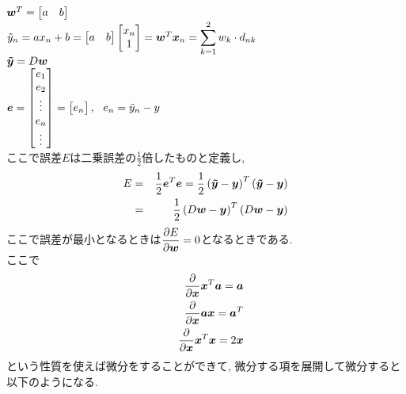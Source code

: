 $\mbox{\boldmath $w$}^{T} = \begin{bmatrix} a&b \end{bmatrix}$\\
$\tilde{y}_{n} = ax_{n}+b = \begin{bmatrix} a&b \end{bmatrix} \begin{bmatrix} x_{n}\\1 \end{bmatrix}=\mbox{\boldmath $w$}^{T}\mbox{\boldmath $x$}_{n} = \displaystyle \sum_{k=1}^{2}w_{k}\cdot d_{nk}$\\
$\mbox{\boldmath $\tilde{y}$} = D\mbox{\boldmath $w$}$\\
$\mbox{\boldmath $e$}=\begin{bmatrix}e_{1}\\e_{2}\\\vdots \\ e_{n}\\ \vdots \end{bmatrix}=\begin{bmatrix}e_{n}\end{bmatrix},\ \ e_{n}=\tilde{y}_{n}-y$\\
ここで誤差$E$は二乗誤差の$\displaystyle \frac{1}{2}$倍したものと定義し,
\begin{eqnarray*}
    E&=&\frac{1}{2}\mbox{\boldmath $e$}^{T} \mbox{\boldmath $e$} = \frac{1}{2}\left(\mbox{\boldmath $\tilde{y}$} -\mbox{\boldmath $y$} \right)^{T}\left(\mbox{\boldmath $\tilde{y}$} -\mbox{\boldmath $y$} \right)\\
    &=&\frac{1}{2}\left(D\mbox{\boldmath $w$}-\mbox{\boldmath $y$}\right)^{T}\left(D\mbox{\boldmath $w$}-\mbox{\boldmath $y$}\right)
\end{eqnarray*}
ここで誤差が最小となるときは$\displaystyle \frac{\partial E}{\partial \mbox{\boldmath $w$}}=0$となるときである.\\
ここで
\begin{eqnarray*}
    &&\frac{\partial}{\partial \mbox{\boldmath $x$}} \mbox{\boldmath $x$}^{T}\mbox{\boldmath $a$} = \mbox{\boldmath $a$}\\
    &&\frac{\partial}{\partial \mbox{\boldmath $x$}} \mbox{\boldmath $a$}\mbox{\boldmath $x$} = \mbox{\boldmath $a$}^{T}\\
    &&\frac{\partial}{\partial \mbox{\boldmath $x$}}\mbox{\boldmath $x$}^{T}\mbox{\boldmath $x$}=2\mbox{\boldmath $x$}
\end{eqnarray*}
という性質を使えば微分をすることができて, 微分する項を展開して微分すると以下のようになる.
